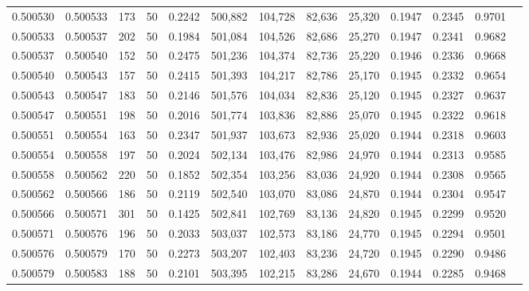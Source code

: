 \begin{tabular}{rrrrrrrrrrrrr}
0.500530 & 0.500533 & 173 &  50 &                                     0.2242 & 500,882 & 104,728 &  82,636 &  25,320 & 0.1947 & 0.2345 & 0.9701 \\
0.500533 & 0.500537 & 202 &  50 &                                     0.1984 & 501,084 & 104,526 &  82,686 &  25,270 & 0.1947 & 0.2341 & 0.9682 \\
0.500537 & 0.500540 & 152 &  50 &                                     0.2475 & 501,236 & 104,374 &  82,736 &  25,220 & 0.1946 & 0.2336 & 0.9668 \\
0.500540 & 0.500543 & 157 &  50 &                                     0.2415 & 501,393 & 104,217 &  82,786 &  25,170 & 0.1945 & 0.2332 & 0.9654 \\
0.500543 & 0.500547 & 183 &  50 &                                     0.2146 & 501,576 & 104,034 &  82,836 &  25,120 & 0.1945 & 0.2327 & 0.9637 \\
0.500547 & 0.500551 & 198 &  50 &                                     0.2016 & 501,774 & 103,836 &  82,886 &  25,070 & 0.1945 & 0.2322 & 0.9618 \\
0.500551 & 0.500554 & 163 &  50 &                                     0.2347 & 501,937 & 103,673 &  82,936 &  25,020 & 0.1944 & 0.2318 & 0.9603 \\
0.500554 & 0.500558 & 197 &  50 &                                     0.2024 & 502,134 & 103,476 &  82,986 &  24,970 & 0.1944 & 0.2313 & 0.9585 \\
0.500558 & 0.500562 & 220 &  50 &                                     0.1852 & 502,354 & 103,256 &  83,036 &  24,920 & 0.1944 & 0.2308 & 0.9565 \\
0.500562 & 0.500566 & 186 &  50 &                                     0.2119 & 502,540 & 103,070 &  83,086 &  24,870 & 0.1944 & 0.2304 & 0.9547 \\
0.500566 & 0.500571 & 301 &  50 &                                     0.1425 & 502,841 & 102,769 &  83,136 &  24,820 & 0.1945 & 0.2299 & 0.9520 \\
0.500571 & 0.500576 & 196 &  50 &                                     0.2033 & 503,037 & 102,573 &  83,186 &  24,770 & 0.1945 & 0.2294 & 0.9501 \\
0.500576 & 0.500579 & 170 &  50 &                                     0.2273 & 503,207 & 102,403 &  83,236 &  24,720 & 0.1945 & 0.2290 & 0.9486 \\
0.500579 & 0.500583 & 188 &  50 &                                     0.2101 & 503,395 & 102,215 &  83,286 &  24,670 & 0.1944 & 0.2285 & 0.9468 \\

\end{tabular}
